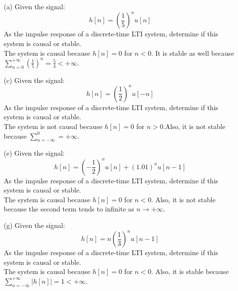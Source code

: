 \documentclass{article}
\begin{document}
\subsection{}
\begin{enumerate}
\item[(a)]
    Given the signal:
    \begin{equation*}
        h[n] = \left(\frac{1}{5}\right)^{n}u[n]
    \end{equation*}
    As the impulse response of a discrete-time LTI system, determine if this system is causal or stable. \\
    The system is causal because $h[n]=0$ for $n<0$. It is stable as well because $\sum\limits_{n=0}^{+\infty} \left(\frac{1}{5}\right)^{n} = \frac{5}{4} < +\infty$.
\item[(c)]
    Given the signal:
    \begin{equation*}
        h[n] = \left(\frac{1}{2}\right)^{n}u[-n]
    \end{equation*}
    As the impulse response of a discrete-time LTI system, determine if this system is causal or stable. \\
    The system is not causal because $h[n]=0$ for $n>0$.Also, it is not stable because $\sum\limits_{n=-\infty}^{0} = +\infty$.
\item[(e)]
    Given the signal:
    \begin{equation*}
        h[n] = \left(-\frac{1}{2}\right)^{n}u[n] + (1.01)^{n}u[n-1]
    \end{equation*}
    As the impulse response of a discrete-time LTI system, determine if this system is causal or stable. \\
    The system is causal because $h[n]=0$ for $n<0$. Also, it is not stable because the second term tends to infinite as $n\to +\infty$.
\item[(g)]
    Given the signal:
    \begin{equation*}
        h[n] = n\left(\frac{1}{3}\right)^{n}u[n-1]
    \end{equation*}
    As the impulse response of a discrete-time LTI system, determine if this system is causal or stable. \\
    The system is causal because $h[n]=0$ for $n<0$. Also, it is stable because  $\sum\limits_{n=-\infty}^{+\infty} |h[n]| = 1 < +\infty$.
\end{enumerate}
\end{document}
